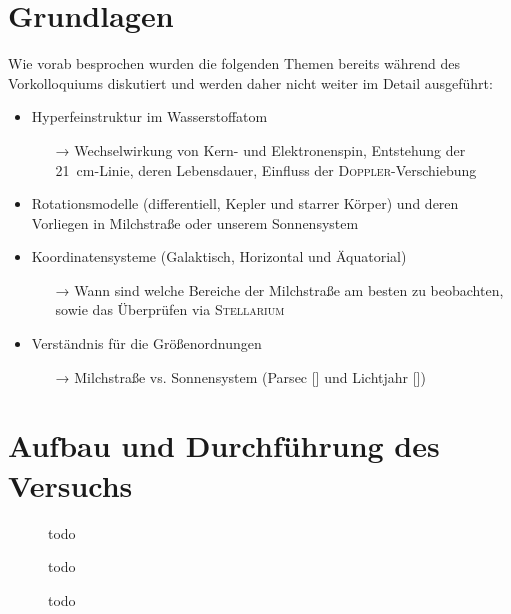 \section{Grundlagen}
Wie vorab besprochen wurden die folgenden Themen bereits während des Vorkolloquiums diskutiert und werden daher nicht weiter im Detail ausgeführt:
\begin{itemize}
    \item Hyperfeinstruktur im Wasserstoffatom
    \begin{itemize}
        \item[→] Wechselwirkung von Kern- und Elektronenspin, Entstehung der \SI{21}{\centi \metre}-Linie, deren Lebensdauer, Einfluss der \textsc{Doppler}-Verschiebung
    \end{itemize}
    \item Rotationsmodelle (differentiell, Kepler und starrer Körper) und deren Vorliegen in Milchstraße oder unserem Sonnensystem
    \item Koordinatensysteme (Galaktisch, Horizontal und Äquatorial)
    \begin{itemize}
        \item[→] Wann sind welche Bereiche der Milchstraße am besten zu beobachten, sowie das Überprüfen via \textsc{Stellarium} 
    \end{itemize}
    \item Verständnis für die Größenordnungen
    \begin{itemize}
        \item[→] Milchstraße vs. Sonnensystem (Parsec [\si{\parsec}] und Lichtjahr [\si{\lightyear}])
    \end{itemize}
\end{itemize}
\section{Aufbau und Durchführung des Versuchs}
\begin{figure}[H]
    \centering
    
    \caption{todo}
    \label{fig:Sonnenabbild}
\end{figure}


\begin{figure}[H]
    \centering
    
    \caption{todo}
    \label{fig:Sonnenkreuz_Az}
\end{figure}

\begin{figure}[H]
    \centering
    
    \caption{todo}
    \label{fig:Sonnenkreuz_Alt}
\end{figure}

